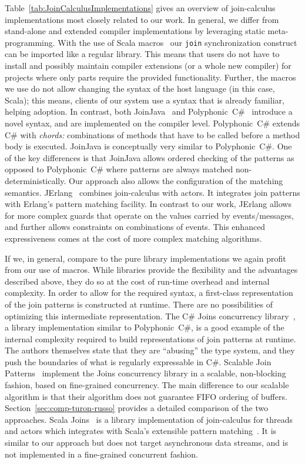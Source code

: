 \documentclass[runningheads]{llncs}
\begin{document}
\begin{sloppypar}
Table~\ref{tab:JoinCalculusImplementations} gives an overview of join-calculus
implementations most closely related to our work.
In general, we differ from stand-alone and extended compiler implementations
by leveraging static meta-programming. With the use of Scala macros~\cite{burmako13}
our \verb|join| synchronization construct
can be imported like a regular library. This means that users do not have to
install and possibly maintain compiler extensions (or a whole new compiler)
for projects where only parts require the provided functionality. Further, the
macros we use do not allow changing the syntax of the host language (in this case, Scala);
this means, clients of our system use a syntax that is already familiar, helping adoption.
In contrast, both JoinJava~\cite{Itzstein:2001} and Polyphonic~C\#~\cite{Benton:2004} introduce
a novel syntax, and are implemented on the compiler level. Polyphonic~C\#
extends C\# with {\em chords:} combinations of methods that have to be called before
a method body is executed. JoinJava is conceptually very similar to Polyphonic~C\#. One of the key
differences is that JoinJava allows ordered checking of the patterns as
opposed to Polyphonic~C\# where patterns are always matched non-deterministically.
Our approach also allows the configuration of the matching
semantics. JErlang~\cite{Plociniczak:2010} combines join-calculus with actors.
It integrates join patterns with Erlang's pattern matching facility. In contrast to our
work, JErlang allows for more complex guards that operate on the values
carried by events/messages, and further allows constraints on combinations of
events. This enhanced expressiveness comes at the cost of more complex matching
algorithms.

If we, in general, compare to the pure library implementations we again profit
from our use of macros. While libraries provide the flexibility and
the advantages described above, they do so at the cost of run-time overhead and
internal complexity. In order to allow for the required syntax, a first-class
representation of the join patterns is constructed at runtime. There are no
possibilities of optimizing this intermediate representation. The C\# Joins
concurrency library~\cite{Russo:2007}, a library implementation similar to
Polyphonic~C\#, is a good example of the internal complexity required to build
representations of join patterns at runtime. The authors themselves state that they are
``abusing'' the type system, and they push the boundaries of what is regularly
expressable in C\#. Scalable Join Patterns~\cite{Turon:2011} implement the Joins concurrency
library in a scalable, non-blocking fashion, based on fine-grained concurrency. The main
difference to our scalable algorithm is that their algorithm does not
guarantee FIFO ordering of buffers. Section~\ref{sec:comp-turon-russo} provides a detailed comparison
of the two approaches. Scala Joins~\cite{Haller:2008} is a library
implementation of join-calculus for threads and actors which integrates with Scala's
extensible pattern matching~\cite{EmirOW07}. It is similar to our approach but does not target
asynchronous data streams, and is not implemented in a fine-grained concurrent fashion.


\end{sloppypar}
\end{document}

